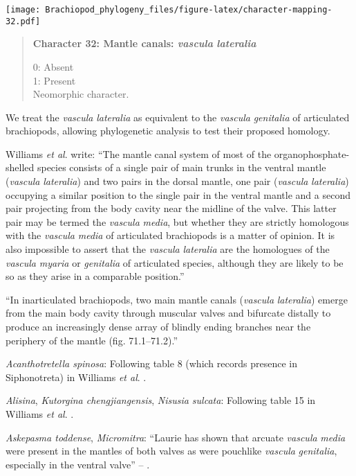 \documentclass[openany]{book}
\theoremstyle{definition}
\theoremstyle{definition}
\theoremstyle{definition}
\theoremstyle{remark}
\begin{document}
\texttt{[image: Brachiopod\_phylogeny\_files/figure-latex/character-mapping-32.pdf]}

\begin{quote}
\textbf{Character 32: Mantle canals: \emph{vascula} \emph{lateralia}}

0: Absent\\
1: Present\\
Neomorphic character.
\end{quote}

We treat the \emph{vascula} \emph{lateralia} as equivalent to the
\emph{vascula} \emph{genitalia} of articulated brachiopods, allowing
phylogenetic analysis to test their proposed homology.

Williams \emph{et al}. \citeyearpar{Williams1997Introduction} write:
``The mantle canal system of most of the organophosphate-shelled species
consists of a single pair of main trunks in the ventral mantle
(\emph{vascula} \emph{lateralia}) and two pairs in the dorsal mantle,
one pair (\emph{vascula} \emph{lateralia}) occupying a similar position
to the single pair in the ventral mantle and a second pair projecting
from the body cavity near the midline of the valve. This latter pair may
be termed the \emph{vascula} \emph{media}, but whether they are strictly
homologous with the \emph{vascula} \emph{media} of articulated
brachiopods is a matter of opinion. It is also impossible to assert that
the \emph{vascula} \emph{lateralia} are the homologues of the
\emph{vascula} \emph{myaria} or \emph{genitalia} of articulated species,
although they are likely to be so as they arise in a comparable
position.''

``In inarticulated brachiopods, two main mantle canals (\emph{vascula}
\emph{lateralia}) emerge from the main body cavity through muscular
valves and bifurcate distally to produce an increasingly dense array of
blindly ending branches near the periphery of the mantle (fig.
71.1--71.2).''

\hypertarget{Acanthotretella_spinosa-coding-32}{}
\emph{Acanthotretella spinosa}: Following table 8 (which records
presence in Siphonotreta) in Williams \emph{et al}.
\citeyearpar{Williams2000LinguliformeaCraniiformea}.

\hypertarget{Alisina-coding-32}{}
\emph{Alisina}, \emph{Kutorgina chengjiangensis}, \emph{Nisusia
sulcata}: Following table 15 in Williams \emph{et al}.
\citeyearpar{Williams2000LinguliformeaCraniiformea}.

\hypertarget{Askepasma_toddense-coding-32}{}
\emph{Askepasma toddense}, \emph{Micromitra}: ``Laurie
\citeyearpar{Laurie1987Themusculature} has shown that arcuate
\emph{vascula} \emph{media} were present in the mantles of both valves
as were pouchlike \emph{vascula} \emph{genitalia}, especially in the
ventral valve'' -- \citet{Williams1997Introduction}.
\end{document}

